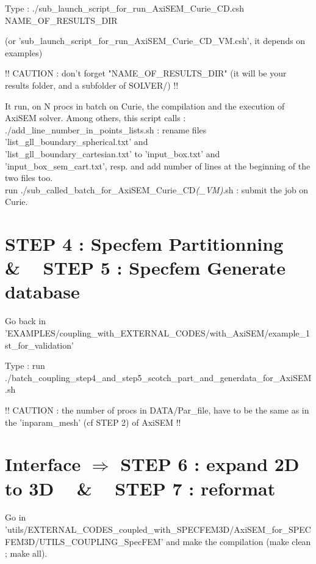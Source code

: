 \documentclass[11pt]{article}
\begin{document}
\medskip

\noindent Type : ./sub\_launch\_script\_for\_run\_AxiSEM\_Curie\_CD.csh NAME\_OF\_RESULTS\_DIR

\smallskip

\noindent (or 'sub\_launch\_script\_for\_run\_AxiSEM\_Curie\_CD\_VM.csh', it depends on examples)

\medskip

\noindent !! CAUTION : don't forget "NAME\_OF\_RESULTS\_DIR" (it will be your results folder, and a subfolder of SOLVER/) !!

\smallskip

\noindent It run, on N procs in batch on Curie, the compilation and the execution of  AxiSEM solver.
Among others, this script calls : \\

\noindent ./add\_line\_number\_in\_points\_lists.sh : rename files 'list\_gll\_boundary\_spherical.txt' and \\ 'list\_gll\_boundary\_cartesian.txt' to 'input\_box.txt' and 'input\_box\_sem\_cart.txt', resp. and add number of lines at the beginning of the two files too. \\

\noindent run ./sub\_called\_batch\_for\_AxiSEM\_Curie\_CD\textit{(\_VM)}.sh : submit the job on Curie.


\section{STEP 4 : Specfem Partitionning ~ \& ~ STEP 5 : Specfem Generate database}

\noindent Go back in 'EXAMPLES/coupling\_with\_EXTERNAL\_CODES/with\_AxiSEM/example\_1st\_for\_validation'

\medskip

\noindent Type : run ./batch\_coupling\_step4\_and\_step5\_scotch\_part\_and\_generdata\_for\_AxiSEM.sh

\medskip

\noindent !! CAUTION : the number of procs in DATA/Par\_file, have to be the same as in the 'inparam\_mesh' (cf STEP 2) of AxiSEM !!


\section{Interface $\Longrightarrow$ STEP 6 : expand 2D to 3D ~ \& ~ STEP 7 : reformat}

\noindent Go in {\scriptsize 'utils/EXTERNAL\_CODES\_coupled\_with\_SPECFEM3D/AxiSEM\_for\_SPECFEM3D/UTILS\_COUPLING\_SpecFEM'} and make the compilation (make clean ; make all).
\end{document}
